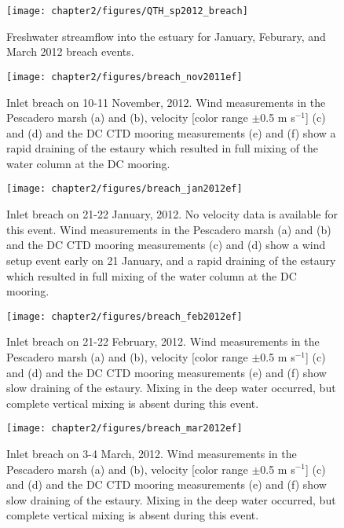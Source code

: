 \begin{figure}
\texttt{[image: chapter2/figures/QTH\_sp2012\_breach]}
\caption{Freshwater streamflow into the estuary for January, Feburary, and March 2012 breach events.} \label{fig:QbreachSpring2012}
\end{figure}




\begin{figure}[tbh]
	\texttt{[image: chapter2/figures/breach\_nov2011ef]} \caption{Inlet breach on 10-11 November, 2012. Wind measurements in the Pescadero marsh (a) and (b), velocity [color range $\pm$0.5 m s$^{-1}$] (c) and (d) and the DC CTD mooring measurements (e) and (f) show a rapid draining of the estaury which resulted in full mixing of the water column at the DC mooring.} \label{fig:ctdBreachNov11}
\end{figure}


\begin{figure}[tbh]
	\centering
	\texttt{[image: chapter2/figures/breach\_jan2012ef]} 
	\caption{Inlet breach on 21-22 January, 2012. No velocity data is available for this event. Wind measurements in the Pescadero marsh (a) and (b) and the DC CTD mooring measurements (c) and (d) show a wind setup event early on 21 January, and a rapid draining of the estaury which resulted in full mixing of the water column at the DC mooring.} \label{fig:ctdBreachJan12}
\end{figure}

\begin{figure}[tbh]
	\centering
	\texttt{[image: chapter2/figures/breach\_feb2012ef]} 
	\caption{Inlet breach on 21-22 February, 2012. Wind measurements in the Pescadero marsh (a) and (b), velocity [color range $\pm$0.5 m s$^{-1}$] (c) and (d) and the DC CTD mooring measurements (e) and (f) show slow draining of the estaury. Mixing in the deep water occurred, but complete vertical mixing is absent during this event.} \label{fig:ctdBreachFeb12}
\end{figure}

\begin{figure}[tbh]
	\centering
	\texttt{[image: chapter2/figures/breach\_mar2012ef]} 
	\caption{Inlet breach on 3-4 March, 2012. Wind measurements in the Pescadero marsh (a) and (b), velocity [color range $\pm$0.5 m s$^{-1}$] (c) and (d) and the DC CTD mooring measurements (e) and (f) show slow draining of the estaury. Mixing in the deep water occurred, but complete vertical mixing is absent during this event.} \label{fig:ctdBreachMar12}
\end{figure}


